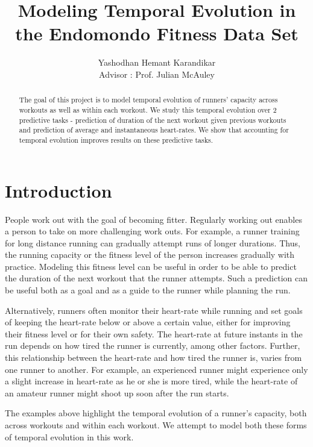 \documentclass{acm_proc_article-sp}
\begin{document}
\title{Modeling Temporal Evolution in the Endomondo Fitness Data Set}
%
%
\author{
\alignauthor
Yashodhan Hemant Karandikar\\
\bigskip
       {Advisor : Prof. Julian McAuley}
}


\maketitle
\begin{abstract}
The goal of this project is to model temporal evolution of runners' capacity across workouts as well as within each workout. We study this temporal evolution over 2 predictive tasks - prediction of duration of the next workout given previous workouts and prediction of average and instantaneous heart-rates. We show that accounting for temporal evolution improves results on these predictive tasks.
\end{abstract}

\section{Introduction}
People work out with the goal of becoming fitter. Regularly working out enables a person to take on more challenging work outs. For example, a runner training for long distance running can gradually attempt runs of longer durations. Thus, the running capacity or the fitness level of the person increases gradually with practice. Modeling this fitness level can be useful in order to be able to predict the duration of the next workout that the runner attempts. Such a prediction can be useful both as a goal and as a guide to the runner while planning the run.

Alternatively, runners often monitor their heart-rate while running and set goals of keeping the heart-rate below or above a certain value, either for improving their fitness level or for their own safety. The heart-rate at future instants in the run depends on how tired the runner is currently, among other factors. Further, this relationship between the heart-rate and how tired the runner is, varies from one runner to another. For example, an experienced runner might experience only a slight increase in heart-rate as he or she is more tired, while the heart-rate of an amateur runner might shoot up soon after the run starts.

The examples above highlight the temporal evolution of a runner's capacity, both across workouts and within each workout. We attempt to model both these forms of temporal evolution in this work.
\end{document}
